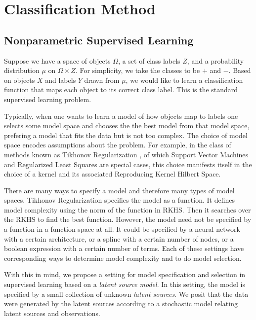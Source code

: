 \chapter{Classification Method}
\label{ch:method}

\section{Nonparametric Supervised Learning}


Suppose we have a space of objects $\Omega$, a set of class labels $Z$, and a
probability distribution $\mu$ on $\Omega \times Z$. For simplicity, we take the
classes to be $+$ and $-$. Based on objects $X$ and labels $Y$ drawn from $\mu$,
we would like to learn a classification function that maps each object to its
correct class label. This is the standard supervised learning problem.

Typically, when one wants to learn a model of how objects map to labels one
selects some model space and chooses the the best model from that model space,
prefering a model that fits the data but is not too complex. The choice of model
space encodes assumptions about the problem. For example, in the class of
methods known as Tikhonov Regularization \cite{Poggio}, of which Support Vector
Machines and Regularized Least Squares are special cases, this choice manifests
itself in the choice of a kernel and its associated Reproducing Kernel Hilbert
Space. 

There are many ways to specify a model and therefore many types of model
spaces. Tikhonov Regularization specifies the model as a function. It defines
model complexity using the norm of the function in RKHS. Then it searches over
the RKHS to find the best function. However, the model need not be specified by
a function in a function space at all. It could be specified by a neural network
with a certain architecture, or a spline with a certain number of nodes, or a
boolean expression with a certain number of terms. Each of these settings have
corresponding ways to determine model complexity and to do model selection.

With this in mind, we propose a setting for model specification and selection in
supervised learning based on a {\em latent source model}. In this setting, the
model is specified by a small collection of unknown {\em latent sources}. We
posit that the data were generated by the latent sources according to a
stochastic model relating latent sources and observations.

